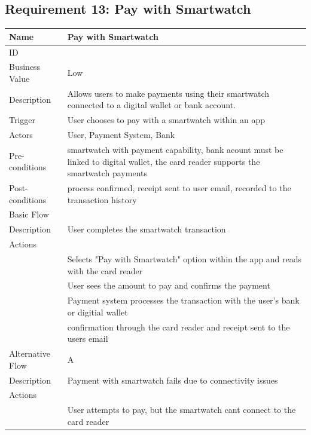 \documentclass{article}
\begin{document}
	\subsection{Requirement 13: Pay with Smartwatch}
		\begin{center}
			\begin{tabularx}{1.0\textwidth}{|>{\raggedright\arraybackslash}p{}|>{\raggedright\arraybackslash}X|}
				\hline
				Name             & Pay with Smartwatch \\ \hline
				ID               & 13 \\ \hline
				Business Value   & Low \\ \hline
				Description      & Allows users to make payments using their smartwatch connected to a digital wallet or bank account. \\ \hline
				Trigger          & User chooses to pay with a smartwatch within an app  \\ \hline
				Actors           & User, Payment System, Bank \\ \hline
				Pre-conditions   & smartwatch with payment capability, bank acount must be linked to digital wallet, the card reader supports the smartwatch payments \\ \hline
				Post-conditions  & process confirmed, receipt sent to user email, recorded to the transaction history \\ \hline
				Basic Flow       & \\ \hline
								Description & User completes the smartwatch transaction \\ \hline
								Actions & \\ \hline
								1 & Selects "Pay with Smartwatch" option within the app and reads with the card reader \\ \hline
								2 & User sees the amount to pay and confirms the payment  \\ \hline
								3 & Payment system processes the transaction with the user's bank or digitial wallet \\ \hline
								4 & confirmation through the card reader and receipt sent to the users email \\ \hline
				Alternative Flow & A \\ \hline
								Description & Payment with smartwatch fails due to connectivity issues \\ \hline
								Actions & \\ \hline
								1 & User attempts to pay, but the smartwatch cant connect to the card reader \\ \hline

\end{tabularx}
\end{center}
\end{document}
